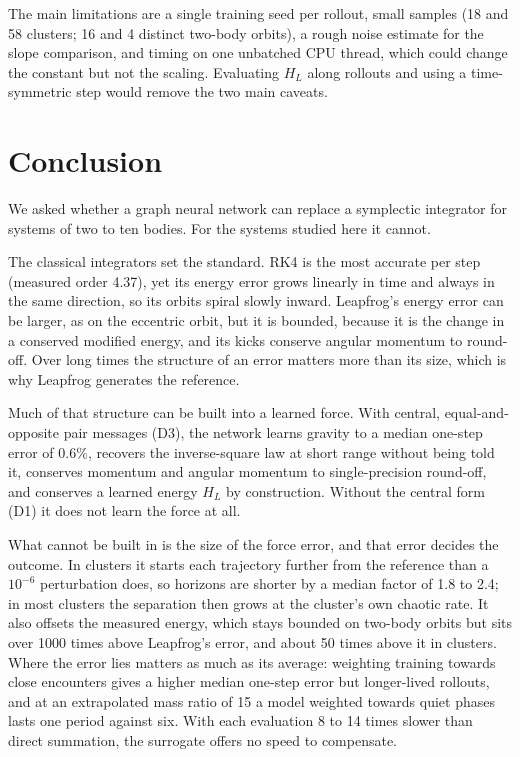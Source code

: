 \documentclass[a4paper,journal]{IEEEtran}
\begin{document}
The main limitations are a single training seed per rollout, small samples (18 and 58 clusters; 16 and 4 distinct two-body orbits), a rough noise estimate for the slope comparison, and timing on one unbatched CPU thread, which could change the constant but not the scaling. Evaluating $H_L$ along rollouts and using a time-symmetric step \cite{Hut1995} would remove the two main caveats.

\section{Conclusion}\label{sec:conclusion}

We asked whether a graph neural network can replace a symplectic integrator for systems of two to ten bodies. For the systems studied here it cannot.

The classical integrators set the standard. RK4 is the most accurate per step (measured order 4.37), yet its energy error grows linearly in time and always in the same direction, so its orbits spiral slowly inward. Leapfrog's energy error can be larger, as on the eccentric orbit, but it is bounded, because it is the change in a conserved modified energy, and its kicks conserve angular momentum to round-off. Over long times the structure of an error matters more than its size, which is why Leapfrog generates the reference.

Much of that structure can be built into a learned force. With central, equal-and-opposite pair messages (D3), the network learns gravity to a median one-step error of $0.6\%$, recovers the inverse-square law at short range without being told it, conserves momentum and angular momentum to single-precision round-off, and conserves a learned energy $H_L$ by construction. Without the central form (D1) it does not learn the force at all.

What cannot be built in is the size of the force error, and that error decides the outcome. In clusters it starts each trajectory further from the reference than a $10^{-6}$ perturbation does, so horizons are shorter by a median factor of 1.8 to 2.4; in most clusters the separation then grows at the cluster's own chaotic rate. It also offsets the measured energy, which stays bounded on two-body orbits but sits over 1000 times above Leapfrog's error, and about 50 times above it in clusters. Where the error lies matters as much as its average: weighting training towards close encounters gives a higher median one-step error but longer-lived rollouts, and at an extrapolated mass ratio of 15 a model weighted towards quiet phases lasts one period against six. With each evaluation 8 to 14 times slower than direct summation, the surrogate offers no speed to compensate.
\end{document}
